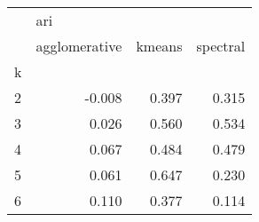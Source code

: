 \begin{tabular}{lrrr}
\toprule
{} & \multicolumn{3}{l}{ari} \\
{} & agglomerative & kmeans & spectral \\
k &               &        &          \\
\midrule
2 &        -0.008 &  0.397 &    0.315 \\
3 &         0.026 &  0.560 &    0.534 \\
4 &         0.067 &  0.484 &    0.479 \\
5 &         0.061 &  0.647 &    0.230 \\
6 &         0.110 &  0.377 &    0.114 \\
\bottomrule
\end{tabular}
